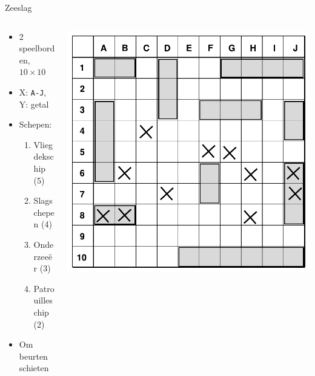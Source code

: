 \documentclass{beamer}
\begin{document}
\begin{frame}{Zeeslag}
	\begin{columns}
		\begin{column}{0.5\textwidth}
			\begin{itemize}
				\item 2 speelborden, $10 \times 10$
				\item X: \texttt{A-J}, Y: getal
				\item Schepen:
					\begin{enumerate}
						\item Vliegdekschip (5)
						\item Slagschepen (4)
						\item Onderzeeër (3)
						\item Patrouilleschip (2)
					\end{enumerate}
				\item Om beurten schieten
			\end{itemize}
		\end{column}
		\begin{column}{0.5\textwidth}
			\includegraphics[width=\linewidth]{zeeslagbord.pdf}
		\end{column}
	\end{columns}
\end{frame}
\end{document}
